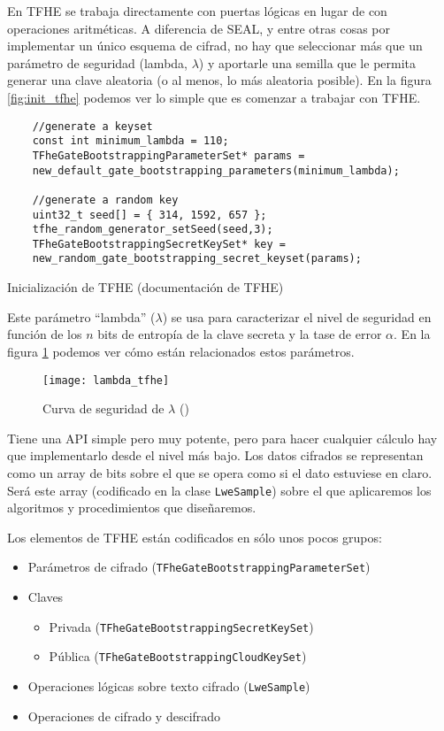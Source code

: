 En TFHE se trabaja directamente con puertas lógicas en lugar de con operaciones aritméticas. A diferencia de SEAL, y entre otras cosas por implementar un único esquema de cifrad, no hay que seleccionar más que un parámetro de seguridad (lambda, $\lambda$) y aportarle una semilla que le permita generar una clave aleatoria (o al menos, lo más aleatoria posible). En la figura \ref{fig:init_tfhe} podemos ver lo simple que es comenzar a trabajar con TFHE.

\begin{listing}
    \begin{verbatim}
    //generate a keyset
    const int minimum_lambda = 110;
    TFheGateBootstrappingParameterSet* params =
    new_default_gate_bootstrapping_parameters(minimum_lambda);

    //generate a random key
    uint32_t seed[] = { 314, 1592, 657 };
    tfhe_random_generator_setSeed(seed,3);
    TFheGateBootstrappingSecretKeySet* key =
    new_random_gate_bootstrapping_secret_keyset(params);
    \end{verbatim}
    \caption{Inicialización de TFHE (documentación de TFHE)}
    \label{fig:init_tfhe}
\end{listing}

Este parámetro ``lambda'' ($\lambda$) se usa para caracterizar el nivel de seguridad en función de los $n$ bits de entropía de la clave secreta y la tase de error $\alpha$. En la figura \ref{fig:lambda_tfhe} podemos ver cómo están relacionados estos parámetros.

\begin{figure}[h]
    \centering
    \texttt{[image: lambda\_tfhe]}
    \caption{Curva de seguridad de $\lambda$ (\cite{cheon_faster_2016})}
    \label{fig:lambda_tfhe}
\end{figure}

Tiene una API simple pero muy potente, pero para hacer cualquier cálculo hay que implementarlo desde el nivel más bajo. Los datos cifrados se representan como un array de bits sobre el que se opera como si el dato estuviese en claro. Será este array (codificado en la clase \verb|LweSample|) sobre el que aplicaremos los algoritmos y procedimientos que diseñaremos.

Los elementos de TFHE están codificados en sólo unos pocos grupos:

\begin{itemize}
  \item Parámetros de cifrado (\verb|TFheGateBootstrappingParameterSet|)
  \item Claves
  \begin{itemize}
      \item Privada (\verb|TFheGateBootstrappingSecretKeySet|)
      \item Pública (\verb|TFheGateBootstrappingCloudKeySet|)
  \end{itemize}
  \item Operaciones lógicas sobre texto cifrado (\verb|LweSample|)
  \item Operaciones de cifrado y descifrado
\end{itemize}

